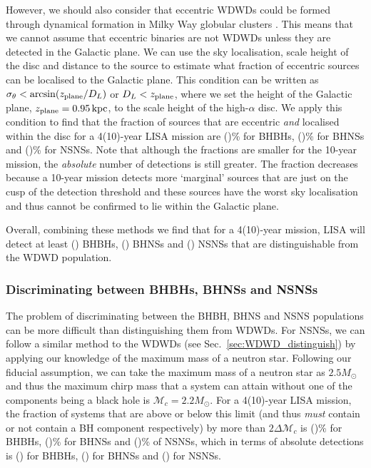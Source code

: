 However, we should also consider that eccentric WDWDs could be formed through dynamical formation in Milky Way globular clusters \citep[e.g.][]{Willems+2007, Kremer+2018}. This means that we cannot assume that eccentric binaries are not WDWDs unless they are detected in the Galactic plane. We can use the sky localisation, scale height of the disc and distance to the source to estimate what fraction of eccentric sources can be localised to the Galactic plane. This condition can be written as $\sigma_\theta < \arcsin(z_{\rm plane} / D_L)$ or $D_L < z_{\rm plane}$, where we set the height of the Galactic plane, $z_{\rm plane}=0.95 \unit{kpc}$, to the scale height of the high-$\alpha$ disc. We apply this condition to find that the fraction of sources that are eccentric \textit{and} localised within the disc for a 4(10)-year LISA mission are \BHBHEccInDiscFourPerc{}(\BHBHEccInDiscTenPerc{})\% for BHBHs, \BHNSEccInDiscFourPerc{}(\BHNSEccInDiscTenPerc{})\% for BHNSs and \NSNSEccInDiscFourPerc{}(\NSNSEccInDiscTenPerc{})\% for NSNSs. Note that although the fractions are smaller for the 10-year mission, the \textit{absolute} number of detections is still greater. The fraction decreases because a 10-year mission detects more `marginal' sources that are just on the cusp of the detection threshold and these sources have the worst sky localisation and thus cannot be confirmed to lie within the Galactic plane.

Overall, combining these methods we find that for a 4(10)-year mission, LISA will detect at least \BHBHNotWDWDFour{}(\BHBHNotWDWDTen{}) BHBHs, \BHNSNotWDWDFour{}(\BHNSNotWDWDTen{}) BHNSs and \NSNSNotWDWDFour{}(\NSNSNotWDWDTen{}) NSNSs that are distinguishable from the WDWD population.

\subsubsection{Discriminating between BHBHs, BHNSs and NSNSs}

The problem of discriminating between the BHBH, BHNS and NSNS populations can be more difficult than distinguishing them from WDWDs. For NSNSs, we can follow a similar method to the WDWDs (see Sec.~\ref{sec:WDWD_distinguish}) by applying our knowledge of the maximum mass of a neutron star. Following our fiducial assumption, we can take the maximum mass of a neutron star as $2.5 \unit{M_{\odot}}$ and thus the maximum chirp mass that a system can attain without one of the components being a black hole is $\mathcal{M}_{c} = 2.2 \unit{M_\odot}$. For a 4(10)-year LISA mission, the fraction of systems that are above or below this limit (and thus \textit{must} contain or not contain a BH component respectively) by more than $2 \Delta \mathcal{M}_c$ is \BHBHEitherBHOrNSFourPerc{}(\BHBHEitherBHOrNSTenPerc{})\% for BHBHs, \BHNSEitherBHOrNSFourPerc{}(\BHNSEitherBHOrNSTenPerc{})\% for BHNSs and \NSNSEitherBHOrNSFourPerc{}(\NSNSEitherBHOrNSTenPerc{})\% of NSNSs, which in terms of absolute detections is \BHBHEitherBHOrNSFour{}(\BHBHEitherBHOrNSTen{}) for BHBHs, \BHNSEitherBHOrNSFour{}(\BHNSEitherBHOrNSTen{}) for BHNSs and \NSNSEitherBHOrNSFour{}(\NSNSEitherBHOrNSTen{}) for NSNSs.

